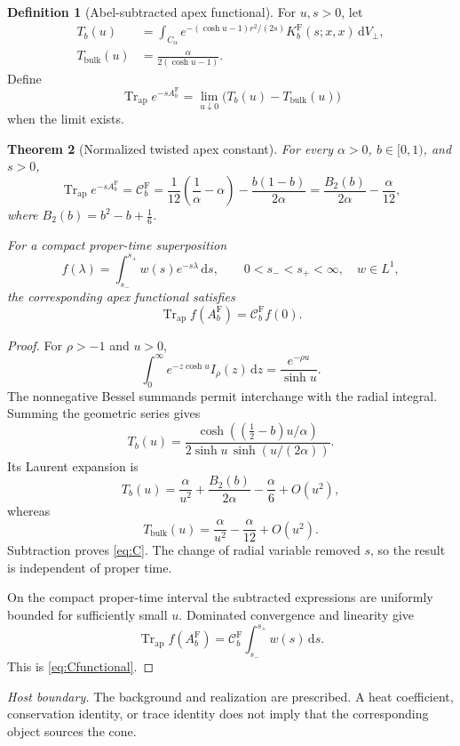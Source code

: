 \documentclass[11pt,a4paper]{article}
\newcommand{\dd}{\mathrm d}
\newcommand{\Fr}{\mathrm F}
\newcommand{\ApTr}{\operatorname{Tr}_{\mathrm{ap}}}
\newcommand{\Ccal}{\mathcal C}
\theoremstyle{plain}
\newtheorem{theorem}{Theorem}[section]
\theoremstyle{definition}
\newtheorem{definition}[theorem]{Definition}
\theoremstyle{remark}
\numberwithin{equation}{section}
\newcommand{\nonsource}{%
  \par\smallskip\noindent
  \emph{Host boundary.}
  The background and realization are prescribed.
  A heat coefficient, conservation identity, or trace identity does
  not imply that the corresponding object sources the cone.%
}
\begin{document}
\begin{definition}[Abel-subtracted apex functional]
\label{def:Abel}
For \(u,s>0\), let
\begin{align}
 T_b(u)
 &=\int_{C_\alpha}
 e^{-(\cosh u-1)r^2/(2s)}
 K_b^\Fr(s;x,x)\,\dd V_\perp,\\
 T_{\mathrm{bulk}}(u)
 &=\frac{\alpha}{2(\cosh u-1)}.
\end{align}
Define
\[
 \ApTr e^{-sA_b^\Fr}
 =\lim_{u\downarrow0}
       \bigl(T_b(u)-T_{\mathrm{bulk}}(u)\bigr)
\]
when the limit exists.
\end{definition}

\begin{theorem}[Normalized twisted apex constant]
\label{thm:C}
For every \(\alpha>0\), \(b\in[0,1)\), and \(s>0\),
\begin{equation}
 \ApTr e^{-sA_b^\Fr}
 =\Ccal_b^\Fr
 =\frac{1}{12}\left(\frac1\alpha-\alpha\right)
       -\frac{b(1-b)}{2\alpha}
 =\frac{B_2(b)}{2\alpha}-\frac{\alpha}{12},
 \label{eq:C}
\end{equation}
where \(B_2(b)=b^2-b+\tfrac16\).

For a compact proper-time superposition
\[
 f(\lambda)=\int_{s_-}^{s_+}w(s)e^{-s\lambda}\,\dd s,
 \qquad 0<s_-<s_+<\infty,\quad w\in L^1,
\]
the corresponding apex functional satisfies
\begin{equation}
 \ApTr f(A_b^\Fr)=\Ccal_b^\Fr f(0).
 \label{eq:Cfunctional}
\end{equation}
\end{theorem}

\begin{proof}
For \(\rho>-1\) and \(u>0\),
\[
 \int_0^\infty e^{-z\cosh u}I_\rho(z)\,\dd z
 =\frac{e^{-\rho u}}{\sinh u}.
\]
The nonnegative Bessel summands permit interchange with the
radial integral. Summing the geometric series gives
\begin{equation}
 T_b(u)=
 \frac{\cosh((\tfrac12-b)u/\alpha)}
      {2\sinh u\,\sinh(u/(2\alpha))}.
 \label{eq:Tclosed}
\end{equation}
Its Laurent expansion is
\[
 T_b(u)=\frac{\alpha}{u^2}
       +\frac{B_2(b)}{2\alpha}-\frac{\alpha}{6}
       +O(u^2),
\]
whereas
\[
 T_{\mathrm{bulk}}(u)
 =\frac{\alpha}{u^2}-\frac{\alpha}{12}+O(u^2).
\]
Subtraction proves \eqref{eq:C}. The change of radial variable
removed \(s\), so the result is independent of proper time.

On the compact proper-time interval the subtracted expressions
are uniformly bounded for sufficiently small \(u\). Dominated
convergence and linearity give
\[
 \ApTr f(A_b^\Fr)
 =\Ccal_b^\Fr\int_{s_-}^{s_+}w(s)\,\dd s.
\]
This is \eqref{eq:Cfunctional}.
\end{proof}
\nonsource
\end{document}
